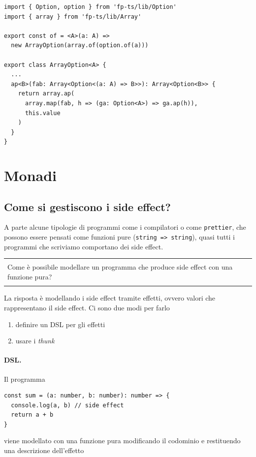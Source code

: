 \documentclass[12pt]{article}
\newenvironment{demo}
    {\begin{center}
    \begin{tabular}{|p{0.9\textwidth}|}
    \hline\\
    }
    {
    \\\\\hline
    \end{tabular}
    \end{center}
    }
\begin{document}
\begin{verbatim}
import { Option, option } from 'fp-ts/lib/Option'
import { array } from 'fp-ts/lib/Array'

export const of = <A>(a: A) =>
  new ArrayOption(array.of(option.of(a)))

export class ArrayOption<A> {
  ...
  ap<B>(fab: Array<Option<(a: A) => B>>): Array<Option<B>> {
    return array.ap(
      array.map(fab, h => (ga: Option<A>) => ga.ap(h)),
      this.value
    )
  }
}
\end{verbatim}

\newpage

\section{Monadi}

\subsection{Come si gestiscono i side effect?}

A parte alcune tipologie di programmi come i compilatori o come \texttt{prettier}, che possono essere pensati come funzioni pure (\texttt{string => string}),
quasi tutti i programmi che scriviamo comportano dei side effect.

\begin{demo}
Come è possibile modellare un programma che produce side effect con una funzione pura?
\end{demo}

La risposta è modellando i side effect tramite effetti, ovvero valori che rappresentano il side effect. Ci sono due modi per farlo

\begin{enumerate}
  \item definire un DSL per gli effetti
  \item usare i \emph{thunk}
\end{enumerate}

\paragraph{DSL.} Il programma

\begin{verbatim}
const sum = (a: number, b: number): number => {
  console.log(a, b) // side effect
  return a + b
}
\end{verbatim}

viene modellato con una funzione pura modificando il codominio e restituendo una descrizione dell'effetto
\end{document}
